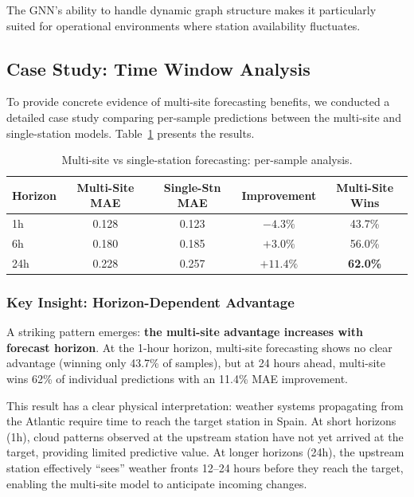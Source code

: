 \documentclass[11pt,a4paper]{article}
\begin{document}
The GNN's ability to handle dynamic graph structure makes it particularly suited for operational environments where station availability fluctuates.

\subsection{Case Study: Time Window Analysis}

To provide concrete evidence of multi-site forecasting benefits, we conducted a detailed case study comparing per-sample predictions between the multi-site and single-station models. Table~\ref{tab:case_study_summary} presents the results.

\begin{table}[H]
\centering
\caption{Multi-site vs single-station forecasting: per-sample analysis.}
\label{tab:case_study_summary}
\begin{tabular}{lcccc}
\toprule
\textbf{Horizon} & \textbf{Multi-Site MAE} & \textbf{Single-Stn MAE} & \textbf{Improvement} & \textbf{Multi-Site Wins} \\
\midrule
1h & 0.128 & 0.123 & $-4.3\%$ & 43.7\% \\
6h & 0.180 & 0.185 & $+3.0\%$ & 56.0\% \\
24h & 0.228 & 0.257 & $\mathbf{+11.4\%}$ & \textbf{62.0\%} \\
\bottomrule
\end{tabular}
\end{table}

\subsubsection{Key Insight: Horizon-Dependent Advantage}

A striking pattern emerges: \textbf{the multi-site advantage increases with forecast horizon}. At the 1-hour horizon, multi-site forecasting shows no clear advantage (winning only 43.7\% of samples), but at 24 hours ahead, multi-site wins 62\% of individual predictions with an 11.4\% MAE improvement.

This result has a clear physical interpretation: weather systems propagating from the Atlantic require time to reach the target station in Spain. At short horizons (1h), cloud patterns observed at the upstream station have not yet arrived at the target, providing limited predictive value. At longer horizons (24h), the upstream station effectively ``sees'' weather fronts 12--24 hours before they reach the target, enabling the multi-site model to anticipate incoming changes.
\end{document}
